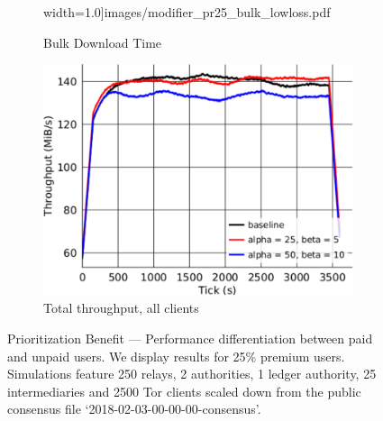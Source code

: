 \begin{figure}
\begin{subfigure}[t]{0.32\textwidth}
  width=1.0\textwidth]{images/modifier_pr25_bulk_lowloss.pdf}
		\caption{Bulk Download Time}
\label{fig:modifier_pr25_bulk}
	\end{subfigure}
	\begin{subfigure}[t]{0.32\textwidth} \centering
\includegraphics[trim={0 0cm 0 0cm}, clip,
  width=1.0\textwidth]{images/modifier_pr25_all_lowloss.pdf}
		\caption{Total throughput, all clients}
\label{fig:modifier_pr25_all}
	\end{subfigure}
	\caption{Prioritization Benefit --- Performance differentiation between
          paid and unpaid users. We display results for 25\% premium users.
          Simulations feature 250 relays, 2 authorities, 1 ledger authority, 25
          intermediaries and 2500 Tor clients scaled down from the public
          consensus file `2018-02-03-00-00-00-consensus'.}
\label{fig:modifier}
\end{figure}


